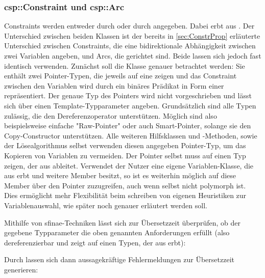 \subsubsection{csp::Constraint und csp::Arc}
\label{sec:ArcConstr}
Constraints werden entweder durch  oder durch  angegeben. Dabei erbt  aus . Der Unterschied
zwischen beiden Klassen ist der bereits in \cref{sec:ConstrProp} erläuterte Unterschied zwischen Constraints, die eine bidirektionale Abhängigkeit zwischen zwei Variablen angeben,
und Arcs, die gerichtet sind. Beide lassen sich jedoch fast identisch verwenden. Zunächst soll die Klasse  genauer betrachtet werden: Sie enthält zwei
Pointer-Typen, die jeweils auf eine  zeigen und das Constraint zwischen den Variablen wird durch ein binäres Prädikat in Form einer 
repräsentiert. Der genaue Typ des Pointers wird nicht vorgeschrieben und lässt sich über einen Template-Typparameter angeben. Grundsätzlich sind alle Typen zulässig, die den
Dereferenzoperator \inlcode{*} unterstützen. Möglich sind also beispielsweise einfache "Raw-Pointer" oder auch Smart-Pointer, solange sie den Copy-Constructor unterstützen. Alle
weiteren Hilfsklassen und -Methoden, sowie der Lösealgorithmus selbst verwenden diesen angegeben Pointer-Typ, um das Kopieren von Variablen zu vermeiden. Der Pointer selbst muss
auf einen Typ zeigen, der aus  ableitet. Verwendet der Nutzer eine eigene Variablen-Klasse, die aus  erbt und weitere Member besitzt, 
so ist es weiterhin möglich auf diese Member über den Pointer zuzugreifen, auch wenn  selbst nicht polymorph ist. Dies ermöglicht mehr Flexibilität beim
schreiben von eigenen Heuristiken zur Variablenauswahl, wie später noch genauer erläutert werden soll.

Mithilfe von \ac*{sfinae}-Techniken lässt sich zur Übersetzzeit überprüfen, ob der gegebene Typparameter die oben genannten Anforderungen erfüllt (also
dereferenzierbar und zeigt auf einen Typen, der aus  erbt):

Durch  lassen sich dann aussagekräftige Fehlermeldungen zur Übersetzzeit generieren:


